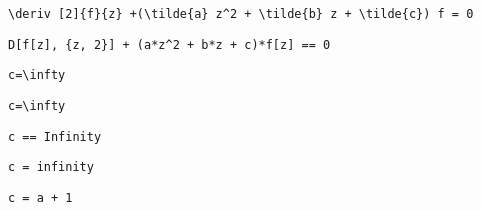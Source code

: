 \newsavebox\BMST
\begin{lrbox}{\BMST}
 \begin{minipage}[t]{0.82\textwidth}
  \lstinline[language={[latex]TeX},mathescape,breaklines=true]"\deriv [2]{f}{z} +(\tilde{a} z^2 + \tilde{b} z + \tilde{c}) f = 0"
 \end{minipage}
\end{lrbox}
\newsavebox\BMMM
\begin{lrbox}{\BMMM}
 \begin{minipage}[t]{0.82\textwidth}
  \lstinline[language={[latex]TeX},mathescape,breaklines=true]"D[f[z], {z, 2}] + (a*z^2 + b*z + c)*f[z] == 0"
 \end{minipage}
\end{lrbox}
\newsavebox\BMMA
\begin{lrbox}{\BMMA}
 \begin{minipage}[t]{0.82\textwidth}
  \lstinline[language={[latex]TeX},mathescape,breaklines=true]""
 \end{minipage}
\end{lrbox}
\newsavebox\BNT
\begin{lrbox}{\BNT}
 \begin{minipage}[t]{0.82\textwidth}
  \lstinline[language={[latex]TeX},mathescape,breaklines=true]"c=\infty"
 \end{minipage}
\end{lrbox}
\newsavebox\BNST
\begin{lrbox}{\BNST}
 \begin{minipage}[t]{0.82\textwidth}
  \lstinline[language={[latex]TeX},mathescape,breaklines=true]"c=\infty"
 \end{minipage}
\end{lrbox}
\newsavebox\BNMM
\begin{lrbox}{\BNMM}
 \begin{minipage}[t]{0.82\textwidth}
  \lstinline[language={[latex]TeX},mathescape,breaklines=true]"c == Infinity"
 \end{minipage}
\end{lrbox}
\newsavebox\BNMA
\begin{lrbox}{\BNMA}
 \begin{minipage}[t]{0.82\textwidth}
  \lstinline[language={[latex]TeX},mathescape,breaklines=true]"c = infinity"
 \end{minipage}
\end{lrbox}
\newsavebox\BOT
\begin{lrbox}{\BOT}
 \begin{minipage}[t]{0.82\textwidth}
  \lstinline[language={[latex]TeX},mathescape,breaklines=true]"c = a + 1"
 \end{minipage}
\end{lrbox}
